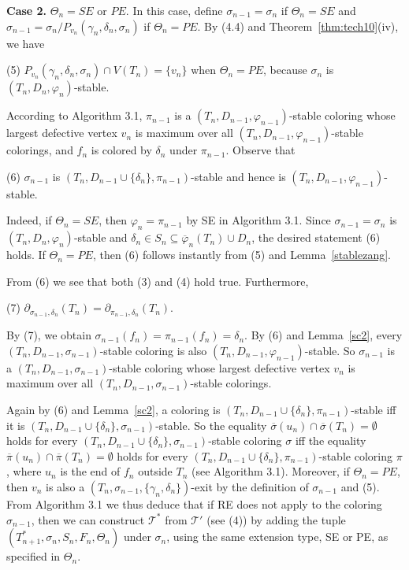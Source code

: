 \documentclass[11pt]{article}
\newcommand{\TT}{\mathcal {T}}
\newcommand{\phibar}{\overline{\varphi}}
\newcommand{\phiv}{\varphi}
\begin{document}
{\bf Case 2.} $\Theta_n=SE$ or $PE$. In this case, define $\sigma_{n-1}=\sigma_n$ if $\Theta_n=SE$ and $\sigma_{n-1}=\sigma_n/P_{v_{n}} (\gamma_{n},
\delta_{n}, \sigma_n)$ if $\Theta_n=PE$. By (4.4) and Theorem~\ref{thm:tech10}(iv), we have 

(5) $P_{v_n}(\gamma_n,\delta_n,\sigma_{n})\cap V(T_n)=\{v_n\}$ when $\Theta_n=PE$, because $\sigma_n$ is $(T_n,D_n,\varphi_n)$-stable. 

According to Algorithm 3.1, $\pi_{n-1}$ is a $(T_n, D_{n-1}, \phiv_{n-1})$-stable coloring whose largest defective vertex $v_n$
is maximum over all $(T_n, D_{n-1}, \phiv_{n-1})$-stable colorings, and $f_n$ is colored by $\delta_n$ under $\pi_{n-1}$.
Observe that

(6) $\sigma_{n-1}$ is $(T_n,D_{n-1}\cup\{\delta_n\},\pi_{n-1})$-stable and hence is $(T_n,D_{n-1},\varphi_{n-1})$-stable. 

Indeed, if $\Theta_n=SE$, then $\phiv_n = \pi_{n-1}$ by SE in Algorithm 3.1. Since $\sigma_{n-1}=\sigma_n$ is 
$(T_n,D_n,\varphi_n)$-stable and $\delta_n\in S_n\subseteq \phibar_n(T_n)\cup D_n$, the desired statement (6) holds. 
If $\Theta_n=PE$, then (6) follows instantly from (5) and Lemma~\ref{stablezang}. 

From (6) we see that both (3) and (4) hold true. Furthermore,  

(7) $\partial_{\sigma_{n-1}, \delta_n}(T_n)= \partial_{\pi_{n-1}, \delta_n}(T_n)$.

By (7), we obtain $\sigma_{n-1}(f_n)=\pi_{n-1}(f_n)=\delta_n$. By (6) and Lemma~\ref{sc2}, every $(T_n, D_{n-1}, \sigma_{n-1})$-stable coloring is
also $(T_n,D_{n-1},\varphi_{n-1})$-stable. So $\sigma_{n-1}$ is a $(T_n, D_{n-1}, \sigma_{n-1})$-stable coloring whose largest 
defective vertex $v_n$ is maximum over all $(T_n, D_{n-1}, \sigma_{n-1})$-stable colorings. 

Again by (6) and Lemma~\ref{sc2}, a coloring is $(T_n,D_{n-1}\cup\{\delta_n\},\pi_{n-1})$-stable 
iff it is $(T_n,D_{n-1}\cup\{\delta_n\},\sigma_{n-1})$-stable. So the equality $\overline{\sigma}(u_n) \cap \overline{\sigma}(T_n)=\emptyset$ holds for every 
$(T_n, D_{n-1}\cup\{\delta_n\}, \sigma_{n-1})$-stable coloring $\sigma$ iff the equality $\overline{\pi}(u_n) \cap \overline{\pi}(T_n)=\emptyset$ holds for every 
$(T_n, D_{n-1}\cup\{\delta_n\}, \pi_{n-1})$-stable coloring $\pi$, where $u_n$ is the end of $f_n$ outside $T_n$ (see Algorithm 3.1). Moreover,
if $\Theta_n=PE$, then $v_n$ is also a $(T_n, \sigma_{n-1}, \{\gamma_n, \delta_n\})$-exit by  the definition of $\sigma_{n-1}$ and (5). 
From Algorithm 3.1 we thus deduce that if RE does not apply to the coloring $\sigma_{n-1}$, then we can construct $\TT^*$ from $\TT'$ (see (4))
by adding the tuple $(T^*_{n+1}, \sigma_{n}, S_{n}, F_{n}, \Theta_{n})$ under $\sigma_n$, using the same extension type, SE or PE, as specified in $\Theta_n$.
\end{document}
